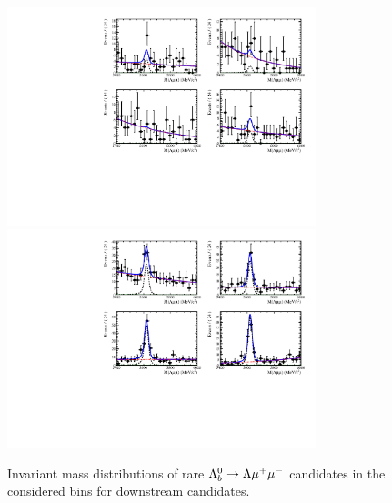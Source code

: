 \begin{figure}
\centering
\includegraphics[width=0.8\textwidth]{Lmumu/figs/MassFits/q2_fits_DD_plot2.pdf}
\includegraphics[width=0.8\textwidth]{Lmumu/figs/MassFits/q2_fits_DD_plot1.pdf}
\caption{Invariant mass distributions of rare $\Lambda^0_b\rightarrow\Lambda\mu^+\mu^-$ candidates in the considered \qsq bins
 for downstream candidates. }
\label{fig:Lb_differentialFit}
\end{figure}

